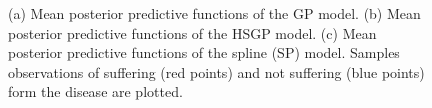 \documentclass[onecolumn,a4paper,11pt]{article}
\begin{document}
\begin{figure}
\caption{(a) Mean posterior predictive functions of the GP model. (b) Mean posterior predictive functions of the HSGP model. (c) Mean posterior predictive functions of the spline (SP) model. Samples observations of suffering (red points) and not suffering (blue points) form the disease are plotted.}
  \label{ch5_fig18_gpfun_diabetes}
\end{figure}
\end{document}
